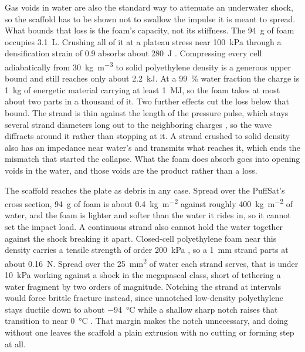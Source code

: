 \documentclass{article}
\begin{document}
Gas voids in water are also the standard way to attenuate an underwater shock, so the scaffold has to be shown not to swallow the impulse it is meant to spread. What bounds that loss is the foam's capacity, not its stiffness. The \SI{94}{\gram} of foam occupies \SI{3.1}{\liter}. Crushing all of it at a plateau stress near \SI{100}{\kilo\pascal} through a densification strain of \num{0.9} absorbs about \SI{280}{\joule} \cite{gibson1997cellular}. Compressing every cell adiabatically from \SI{30}{\kilo\gram\per\cubic\meter} to solid polyethylene density is a generous upper bound and still reaches only about \SI{2.2}{\kilo\joule}. At a \SI{99}{\percent} water fraction the charge is \SI{1}{\kilo\gram} of energetic material carrying at least \SI{1}{\mega\joule}, so the foam takes at most about two parts in a thousand of it. Two further effects cut the loss below that bound. The strand is thin against the length of the pressure pulse, which stays several strand diameters long out to the neighboring charges \cite{cole1948underwater}, so the wave diffracts around it rather than stopping at it. A strand crushed to solid density also has an impedance near water's and transmits what reaches it, which ends the mismatch that started the collapse. What the foam does absorb goes into opening voids in the water, and those voids are the product rather than a loss.

The scaffold reaches the plate as debris in any case. Spread over the PuffSat's cross section, \SI{94}{\gram} of foam is about \SI{0.4}{\kilo\gram\per\square\meter} against roughly \SI{400}{\kilo\gram\per\square\meter} of water, and the foam is lighter and softer than the water it rides in, so it cannot set the impact load. A continuous strand also cannot hold the water together against the shock breaking it apart. Closed-cell polyethylene foam near this density carries a tensile strength of order \SI{200}{\kilo\pascal} \cite{gibson1997cellular}, so a \SI{1}{\milli\meter} strand parts at about \SI{0.16}{\newton}. Spread over the \SI{25}{\square\milli\meter} of water each strand serves, that is under \SI{10}{\kilo\pascal} working against a shock in the megapascal class, short of tethering a water fragment by two orders of magnitude. Notching the strand at intervals would force brittle fracture instead, since unnotched low-density polyethylene stays ductile down to about \SI{-94}{\celsius} while a shallow sharp notch raises that transition to near \SI{0}{\celsius} \cite{zewi1980ldpe}. That margin makes the notch unnecessary, and doing without one leaves the scaffold a plain extrusion with no cutting or forming step at all.
\end{document}
